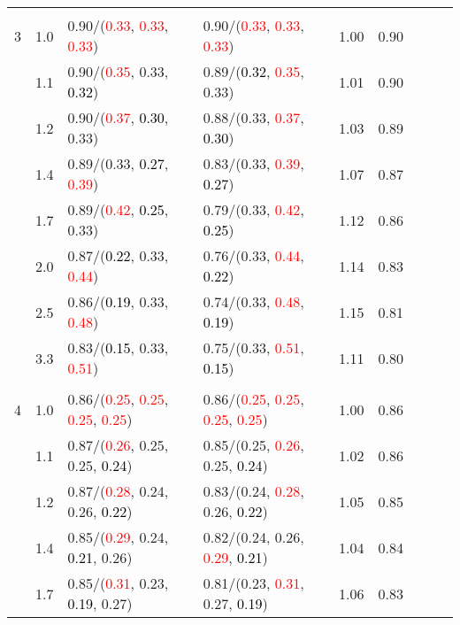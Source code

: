 \documentclass[10pt,a4paper]{report}
\begin{document}
\begin{table}[!htbp]
\begin{center}
{\begin{tabular}{ccllccccc}
			&&&&\\
			3			&1.0&0.90/(\textcolor{red}{0.33}, \textcolor{red}{0.33}, \textcolor{red}{0.33})&0.90/(\textcolor{red}{0.33}, \textcolor{red}{0.33}, \textcolor{red}{0.33})&1.00&0.90\\
			&1.1&0.90/(\textcolor{red}{0.35}, 0.33, \textcolor{black}{0.32})&0.89/(\textcolor{black}{0.32}, \textcolor{red}{0.35}, 0.33)&1.01&0.90\\
			&1.2&0.90/(\textcolor{red}{0.37}, \textcolor{black}{0.30}, 0.33)&0.88/(0.33, \textcolor{red}{0.37}, \textcolor{black}{0.30})&1.03&0.89\\
			&1.4&0.89/(0.33, \textcolor{black}{0.27}, \textcolor{red}{0.39})&0.83/(0.33, \textcolor{red}{0.39}, \textcolor{black}{0.27})&1.07&0.87\\
			&1.7&0.89/(\textcolor{red}{0.42}, \textcolor{black}{0.25}, 0.33)&0.79/(0.33, \textcolor{red}{0.42}, \textcolor{black}{0.25})&1.12&0.86\\
			&2.0&0.87/(\textcolor{black}{0.22}, 0.33, \textcolor{red}{0.44})&0.76/(0.33, \textcolor{red}{0.44}, \textcolor{black}{0.22})&1.14&0.83\\
			&2.5&0.86/(\textcolor{black}{0.19}, 0.33, \textcolor{red}{0.48})&0.74/(0.33, \textcolor{red}{0.48}, \textcolor{black}{0.19})&1.15&0.81\\
			&3.3&0.83/(\textcolor{black}{0.15}, 0.33, \textcolor{red}{0.51})&0.75/(0.33, \textcolor{red}{0.51}, \textcolor{black}{0.15})&1.11&0.80\\
			&&&&\\
			4			&1.0&0.86/(\textcolor{red}{0.25}, \textcolor{red}{0.25}, \textcolor{red}{0.25}, \textcolor{red}{0.25})&0.86/(\textcolor{red}{0.25}, \textcolor{red}{0.25}, \textcolor{red}{0.25}, \textcolor{red}{0.25})&1.00&0.86\\
			&1.1&0.87/(\textcolor{red}{0.26}, 0.25, 0.25, \textcolor{black}{0.24})&0.85/(0.25, \textcolor{red}{0.26}, 0.25, \textcolor{black}{0.24})&1.02&0.86\\
			&1.2&0.87/(\textcolor{red}{0.28}, 0.24, 0.26, \textcolor{black}{0.22})&0.83/(0.24, \textcolor{red}{0.28}, 0.26, \textcolor{black}{0.22})&1.05&0.85\\
			&1.4&0.85/(\textcolor{red}{0.29}, 0.24, \textcolor{black}{0.21}, 0.26)&0.82/(0.24, 0.26, \textcolor{red}{0.29}, \textcolor{black}{0.21})&1.04&0.84\\
			&1.7&0.85/(\textcolor{red}{0.31}, 0.23, \textcolor{black}{0.19}, 0.27)&0.81/(0.23, \textcolor{red}{0.31}, 0.27, \textcolor{black}{0.19})&1.06&0.83\\

\end{tabular}}
\end{center}
\end{table}
\end{document}
